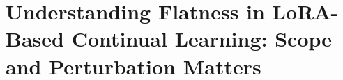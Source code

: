 \documentclass[letterpaper]{article} %
\newcommand{\LYY}[1]{{\color{magenta}{\bf LYY:} #1}}
\begin{document}













\section{Understanding Flatness in LoRA-Based Continual Learning: Scope and Perturbation Matters}
\end{document}
